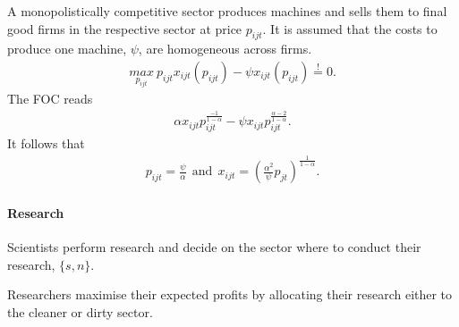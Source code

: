 \documentclass[12pt]{article}
\begin{document}
A monopolistically competitive sector produces machines and sells them to final good firms in the respective sector at price $p_{ijt}$. It is assumed that the costs to produce one machine, $\psi$, are homogeneous across firms.
\begin{align*}
\underset{p_{ijt}}{max}\  p_{ijt}x_{ijt}(p_{ijt})-\psi x_{ijt}(p_{ijt}) \overset{!}{=}0.
\end{align*}
The FOC reads
\begin{align*}
\alpha x_{ijt}p_{ijt}^{\frac{-1}{1-\alpha}}-\psi x_{ijt}p_{ijt}^{\frac{\alpha-2}{1-\alpha}}.
\end{align*}
It follows that 
\begin{align*}
p_{ijt}=\frac{\psi}{\alpha}\ \ \text{and} \ \  x_{ijt}=\left(\frac{\alpha^2}{\psi}p_{jt}\right)^\frac{1}{1-\alpha}.
\end{align*}

\paragraph{Research}
Scientists perform research and decide on the sector where to conduct their research, $\{s,n\}$. 

Researchers maximise their expected profits by allocating their research either to the cleaner or dirty sector. 
\end{document}
